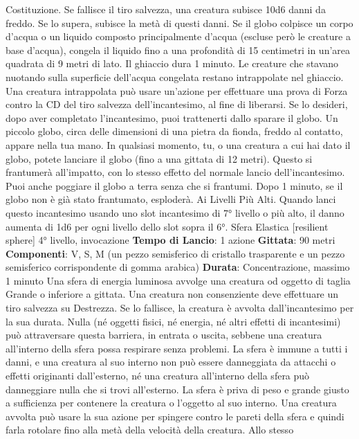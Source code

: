 \begin{multicols}{2}
Costituzione. Se fallisce il tiro salvezza, una creatura
subisce 10d6 danni da freddo. Se lo supera, subisce la
metà di questi danni.
Se il globo colpisce un corpo d’acqua o un liquido
composto principalmente d’acqua (escluse però le
creature a base d’acqua), congela il liquido fino a una
profondità di 15 centimetri in un’area quadrata di 9 metri
di lato. Il ghiaccio dura 1 minuto. Le creature che
stavano nuotando sulla superficie dell’acqua congelata
restano intrappolate nel ghiaccio. Una creatura
intrappolata può usare un’azione per effettuare una
prova di Forza contro la CD del tiro salvezza
dell’incantesimo, al fine di liberarsi.
Se lo desideri, dopo aver completato l’incantesimo, puoi
trattenerti dallo sparare il globo. Un piccolo globo, circa
delle dimensioni di una pietra da fionda, freddo al
contatto, appare nella tua mano. In qualsiasi momento,
tu, o una creatura a cui hai dato il globo, potete lanciare
il globo (fino a una gittata di 12 metri). Questo si
frantumerà all’impatto, con lo stesso effetto del normale
lancio dell’incantesimo. Puoi anche poggiare il globo a
terra senza che si frantumi. Dopo 1 minuto, se il globo
non è già stato frantumato, esploderà.
Ai Livelli Più Alti. Quando lanci questo incantesimo
usando uno slot incantesimo di 7° livello o più alto, il
danno aumenta di 1d6 per ogni livello dello slot sopra il
6°.
Sfera Elastica
[resilient sphere]
4° livello, invocazione
\textbf{Tempo di Lancio}: 1 azione
\textbf{Gittata}: 90 metri
\textbf{Componenti}: V, S, M (un pezzo semisferico di cristallo
trasparente e un pezzo semisferico corrispondente di
gomma arabica)
\textbf{Durata}: Concentrazione, massimo 1 minuto
Una sfera di energia luminosa avvolge una creatura od
oggetto di taglia Grande o inferiore a gittata. Una
creatura non consenziente deve effettuare un tiro 
salvezza su Destrezza. Se lo fallisce, la creatura è
avvolta dall’incantesimo per la sua durata.
Nulla (né oggetti fisici, né energia, né altri effetti di
incantesimi) può attraversare questa barriera, in entrata
o uscita, sebbene una creatura all’interno della sfera
possa respirare senza problemi. La sfera è immune a
tutti i danni, e una creatura al suo interno non può
essere danneggiata da attacchi o effetti originanti
dall’esterno, né una creatura all’interno della sfera può
danneggiare nulla che si trovi all’esterno.
La sfera è priva di peso e grande giusto a sufficienza
per contenere la creatura o l’oggetto al suo interno. Una
creatura avvolta può usare la sua azione per spingere
contro le pareti della sfera e quindi farla rotolare fino
alla metà della velocità della creatura. Allo stesso

\end{multicols}
